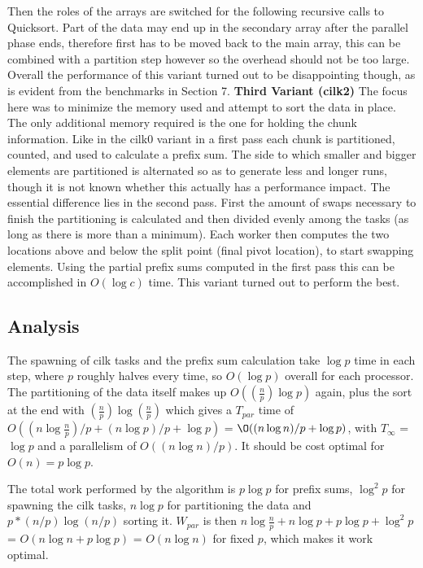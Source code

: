 \documentclass[12pt,a4paper]{article}
\begin{document}
Then the roles of the arrays are switched for the following recursive calls to Quicksort. Part of the data may end up in the secondary array after the parallel phase ends, therefore first has to be moved back to the main array, this can be combined with a partition step however so the overhead should not be too large. Overall the performance of this variant turned out to be disappointing though, as is evident from the benchmarks in Section 7.
\newline\newline
\textbf{Third Variant (cilk2)}\newline
The focus here was to minimize the memory used and attempt to sort the data in place. The only additional memory required is the one for holding the chunk information. Like in the cilk0 variant in a first pass each chunk is partitioned, counted, and used to calculate a prefix sum. The side to which smaller and bigger elements are partitioned is alternated so as to generate less and longer runs, though it is not known whether this actually has a performance impact. The essential difference lies in the second pass. First the amount of swaps necessary to finish the partitioning is calculated and then divided evenly among the tasks (as long as there is more than a minimum). Each worker then computes the two locations above and below the split point (final pivot location), to start swapping elements. Using the partial prefix sums computed in the first pass this can be accomplished in $O(\log c)$ time. This variant turned out to perform the best.
\subsection{Analysis}
The spawning of cilk tasks and the prefix sum calculation take $\log p$ time in each step, where $p$ roughly halves every time, so $O(\log p)$ overall for each processor. The partitioning of the data itself makes up $O((\frac{n}{p})\log p)$ again, plus the sort at the end with $(\frac{n}{p})\log(\frac{n}{p})$ which gives a $T_{par}$ time of $O((n\log\frac{n}{p})/p + (n\log p)/p + \log p)$ = $\O((n\log n)/p + \log p)$, with $T_{\infty}$ = $\log p$ and a parallelism of $O((n\log n)/p)$. It should be cost optimal for $O(n) = p\log p$. 

The total work performed by the algorithm is $p\log p$ for prefix sums, $\log^2 p$ for spawning the cilk tasks, $n\log p$ for partitioning the data and $p*(n/p)\log(n/p)$ sorting it. $W_{par}$ is then $n\log\frac{n}{p} + n\log p + p\log p + \log^2p$ = $O(n\log n + p\log p)$ = $O(n\log n)$ for fixed $p$, which makes it work optimal.
\end{document}
